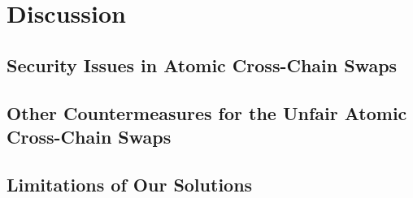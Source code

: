 \section{Discussion}
\label{sec:discussion}

\subsection{Security Issues in Atomic Cross-Chain Swaps}

\subsection{Other Countermeasures for the Unfair Atomic Cross-Chain Swaps}

\subsection{Limitations of Our Solutions}



